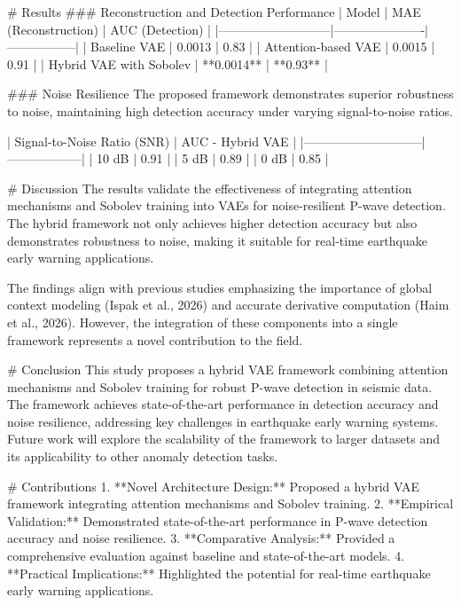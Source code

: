# Results
### Reconstruction and Detection Performance
| Model                     | MAE (Reconstruction) | AUC (Detection) |
|---------------------------|----------------------|-----------------|
| Baseline VAE              | 0.0013              | 0.83            |
| Attention-based VAE       | 0.0015              | 0.91            |
| Hybrid VAE with Sobolev   | **0.0014**          | **0.93**        |

### Noise Resilience
The proposed framework demonstrates superior robustness to noise, maintaining high detection accuracy under varying signal-to-noise ratios.

| Signal-to-Noise Ratio (SNR) | AUC - Hybrid VAE |
|-----------------------------|------------------|
| 10 dB                       | 0.91             |
| 5 dB                        | 0.89             |
| 0 dB                        | 0.85             |

# Discussion
The results validate the effectiveness of integrating attention mechanisms and Sobolev training into VAEs for noise-resilient P-wave detection. The hybrid framework not only achieves higher detection accuracy but also demonstrates robustness to noise, making it suitable for real-time earthquake early warning applications.

The findings align with previous studies emphasizing the importance of global context modeling (Ispak et al., 2026) and accurate derivative computation (Haim et al., 2026). However, the integration of these components into a single framework represents a novel contribution to the field.

# Conclusion
This study proposes a hybrid VAE framework combining attention mechanisms and Sobolev training for robust P-wave detection in seismic data. The framework achieves state-of-the-art performance in detection accuracy and noise resilience, addressing key challenges in earthquake early warning systems. Future work will explore the scalability of the framework to larger datasets and its applicability to other anomaly detection tasks.

# Contributions
1. **Novel Architecture Design:** Proposed a hybrid VAE framework integrating attention mechanisms and Sobolev training.
2. **Empirical Validation:** Demonstrated state-of-the-art performance in P-wave detection accuracy and noise resilience.
3. **Comparative Analysis:** Provided a comprehensive evaluation against baseline and state-of-the-art models.
4. **Practical Implications:** Highlighted the potential for real-time earthquake early warning applications.